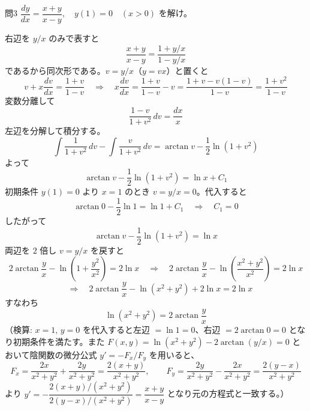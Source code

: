 \documentclass[a4paper,11pt]{article}
\begin{document}
\clearpage
\begin{mondaiboxS}{問3}
$\dfrac{dy}{dx} = \dfrac{x+y}{x-y}, \quad y(1) = 0 \quad (x > 0)$ を解け。
\end{mondaiboxS}
\kaitou
右辺を $y/x$ のみで表すと
\[
\frac{x+y}{x-y} = \frac{1 + y/x}{1 - y/x}
\]
であるから同次形である。$v = y/x$（$y = vx$）と置くと
\[
v + x\frac{dv}{dx} = \frac{1+v}{1-v}
\quad\Longrightarrow\quad
x\frac{dv}{dx} = \frac{1+v}{1-v} - v = \frac{1+v - v(1-v)}{1-v} = \frac{1+v^{2}}{1-v}
\]
変数分離して
\[
\frac{1-v}{1+v^{2}}\,dv = \frac{dx}{x}
\]
左辺を分解して積分する。
\[
\int\frac{1}{1+v^{2}}\,dv - \int\frac{v}{1+v^{2}}\,dv
= \arctan v - \frac12\ln\!\left(1+v^{2}\right)
\]
よって
\[
\arctan v - \frac12\ln\!\left(1+v^{2}\right) = \ln x + C_{1}
\]
初期条件 $y(1)=0$ より $x=1$ のとき $v = y/x = 0$。代入すると
\[
\arctan 0 - \frac12\ln 1 = \ln 1 + C_{1}
\quad\Longrightarrow\quad
C_{1} = 0
\]
したがって
\[
\arctan v - \frac12\ln\!\left(1+v^{2}\right) = \ln x
\]
両辺を $2$ 倍し $v = y/x$ を戻すと
\[
2\arctan\frac{y}{x} - \ln\!\left(1 + \frac{y^{2}}{x^{2}}\right) = 2\ln x
\quad\Longrightarrow\quad
2\arctan\frac{y}{x} - \ln\!\left(\frac{x^{2}+y^{2}}{x^{2}}\right) = 2\ln x
\]
\[
\quad\Longrightarrow\quad
2\arctan\frac{y}{x} - \ln\!\left(x^{2}+y^{2}\right) + 2\ln x = 2\ln x
\]
すなわち
\[
\boxed{\; \ln\!\left(x^{2}+y^{2}\right) = 2\arctan\frac{y}{x} \;}
\]
（検算: $x=1,\,y=0$ を代入すると左辺 $=\ln 1 = 0$、右辺 $=2\arctan 0 = 0$ となり初期条件を満たす。また $F(x,y) = \ln(x^{2}+y^{2}) - 2\arctan(y/x) = 0$ とおいて陰関数の微分公式 $y' = -F_{x}/F_{y}$ を用いると、
\[
F_{x} = \frac{2x}{x^{2}+y^{2}} + \frac{2y}{x^{2}+y^{2}} = \frac{2(x+y)}{x^{2}+y^{2}},
\qquad
F_{y} = \frac{2y}{x^{2}+y^{2}} - \frac{2x}{x^{2}+y^{2}} = \frac{2(y-x)}{x^{2}+y^{2}}
\]
より $y' = -\dfrac{2(x+y)/(x^{2}+y^{2})}{2(y-x)/(x^{2}+y^{2})} = \dfrac{x+y}{x-y}$ となり元の方程式と一致する。）
\end{document}
